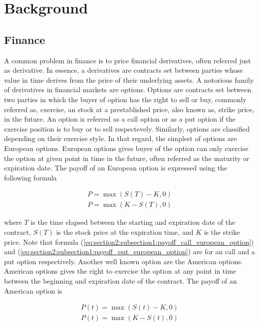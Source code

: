 
\section{Background} \label{sec:_background}

\subsection{Finance}

A common problem in finance is to price financial derivatives, often referred just
as derivative. In essence, a derivatives are contracts set between parties 
whose value in time derives from the price of their underlying assets. A notorious
family of derivatives in financial markets are options. Options are contracts set 
between two parties in which the buyer of option has the right to sell or buy, 
commonly referred as, exercise, an stock at a prestablished price, also known as, 
strike price, in the future. An option is referred as a call option or as a put 
option if the exercise position is to buy or to sell respectevely. Similarly, 
options are classified depending on their exercise style. In that regard,
the simplest of options are European options. European options gives buyer of 
the option can only exercise the option at given point in time in the future, 
often referred as the maturity or expiration date. The payoff of an European 
option is expressed using the following formula

\begin{align}
  P = \max(S(T) - K, 0) 
  \label{eq:section2:subsection1:payoff_call_european_option}\\
  P = \max(K - S(T), 0)
  \label{eq:section2:subsection1:payoff_put_european_option} 
\end{align}

where $T$ is the time elapsed between the starting and expiration date of the 
contract, $S(T)$ is the stock price at the expiration time, and $K$ is the strike 
price. Note that formula (\ref*{eq:section2:subsection1:payoff_call_european_option})
and (\ref*{eq:section2:subsection1:payoff_put_european_option}) are for an call and a 
put option respectively. Another well known option are the American options. American options
gives the right to exercise the option at any point in time between the beginning 
and expiration date of the contract. The payoff of an American option is

\begin{align}
  P(t) = \max(S(t) - K, 0) 
  \label{eq:section2:subsection1:payoff_call_european_option}\\
  P(t) = \max(K - S(t), 0)
  \label{eq:section2:subsection1:payoff_put_european_option} 
\end{align}

